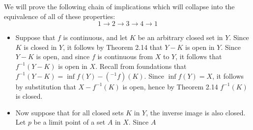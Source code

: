 \documentclass{article}
\newcommand{\inv}[1]{#1^{-1}}
\begin{document}
 We will prove the following chain of implications which will collapse into the equivalence of all of these properties: $$1\rightarrow 2\rightarrow3\rightarrow4\rightarrow1 $$
\begin{itemize}
    \item Suppose that $f$ is continuous, and let $K$ be an arbitrary closed set in $Y$. Since $K$ is closed in $Y$, it follows by Theorem 2.14 that $Y-K$ is open in $Y$. Since $Y-K$ is open, and since $f$ is continuous from $X$ to $Y$, it follows that $\inv{f}(Y-K)$ is open in $X$. Recall from foundations that $\inv{f}(Y-K) = \inf{f}(Y) - \inv(f)(K)$. Since $\inf{f}(Y) = X$, it follows by substitution that $X - \inv{f}(K)$ is open, hence by Theorem 2.14 $\inv{f}(K)$ is closed.
    \item Now suppose that for all closed sets $K$ in $Y$, the inverse image is also closed. Let $p$ be a limit point of a set $A$ in $X$. Since $A$
\end{itemize}
\end{document}
